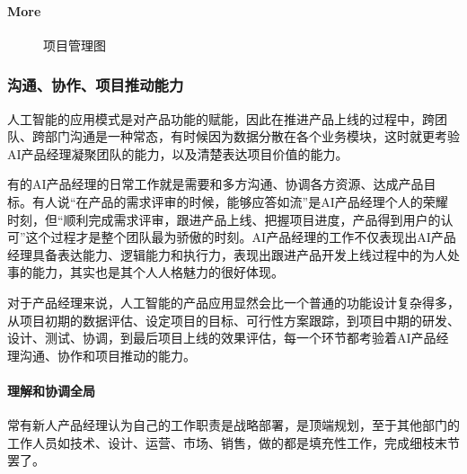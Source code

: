 \documentclass[letterpaper,11pt,english]{sphinxmanual}
\begin{document}
\paragraph{More}
\label{\detokenize{chapter_knowledge/project_manage:more}}
\begin{figure}[H]
\centering
\capstart

\noindent{}
\caption{项目管理图}\label{\detokenize{chapter_knowledge/project_manage:id24}}\end{figure}


\subsubsection{沟通、协作、项目推动能力}
\label{\detokenize{chapter_knowledge/collaborate:id1}}\label{\detokenize{chapter_knowledge/collaborate::doc}}
人工智能的应用模式是对产品功能的赋能，因此在推进产品上线的过程中，跨团队、跨部门沟通是一种常态，有时候因为数据分散在各个业务模块，这时就更考验AI产品经理凝聚团队的能力，以及清楚表达项目价值的能力。

有的AI产品经理的日常工作就是需要和多方沟通、协调各方资源、达成产品目标。有人说“在产品的需求评审的时候，能够应答如流”是AI产品经理个人的荣耀时刻，但“顺利完成需求评审，跟进产品上线、把握项目进度，产品得到用户的认可”这个过程才是整个团队最为骄傲的时刻。AI产品经理的工作不仅表现出AI产品经理具备表达能力、逻辑能力和执行力，表现出跟进产品开发上线过程中的为人处事的能力，其实也是其个人人格魅力的很好体现。

对于产品经理来说，人工智能的产品应用显然会比一个普通的功能设计复杂得多，从项目初期的数据评估、设定项目的目标、可行性方案跟踪，到项目中期的研发、设计、测试、协调，到最后项目上线的效果评估，每一个环节都考验着AI产品经理沟通、协作和项目推动的能力。%
\begin{footnote}[570]\sphinxAtStartFootnote
{}
%
\end{footnote}


\paragraph{理解和协调全局}
\label{\detokenize{chapter_knowledge/collaborate:id2}}
常有新人产品经理认为自己的工作职责是战略部署，是顶端规划，至于其他部门的工作人员如技术、设计、运营、市场、销售，做的都是填充性工作，完成细枝末节罢了。
\end{document}
